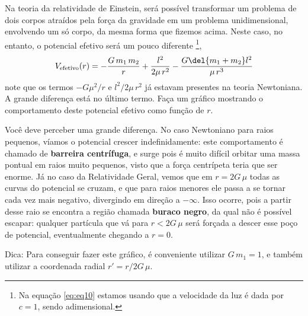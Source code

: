 \documentclass[]{IMTexam}
\begin{document}
\begin{questions}
\begin{parts}
	\end{parts}


	Na teoria da relatividade de Einstein, será possível transformar um problema de dois corpos atraídos pela força da gravidade em um problema unidimensional, envolvendo um só corpo, da mesma forma que fizemos acima. Neste caso, no entanto, o potencial efetivo será um pouco diferente%
	\footnote{Na equação \ref{eq:eq10} estamos usando que a velocidade da luz é dada por $ c = 1 $, sendo adimensional.},
	\begin{equation}\label{eq:eq10}
		V_{\textup{efetivo}}(r)=-\dfrac{G\,m_1\,m_2}{r}+\dfrac{l^{2}}{2\mu\,r^{2}}-\dfrac{G\del{m_1+m_2}l^{2}}{\mu\,r^{3}}
	\end{equation}
	note que os termos $ -G\mu^{2}/r $ e $ l^{2}/2\mu\,r^{2} $ já estavam presentes na teoria Newtoniana. A grande diferença está no último termo. Faça um gráfico mostrando o comportamento deste potencial efetivo como função de $ r $.

	Você deve perceber uma grande diferença. No caso Newtoniano para raios pequenos, víamos o potencial crescer indefinidamente: este comportamento é chamado de \textbf{barreira centrífuga}, e surge pois é muito difícil orbitar uma massa pontual em raios muito pequenos, visto que a força centrípeta teria que ser enorme. Já no caso da Relatividade Geral, vemos que em $ r = 2G\,\mu $  todas as curvas do potencial se cruzam, e que para raios menores ele passa a se tornar cada vez mais negativo, divergindo em direção a $ -\infty $. Isso ocorre, pois a partir desse raio se encontra a região chamada \textbf{buraco negro}, da qual não é possível escapar: qualquer partícula que vá para $ r<2G\,\mu $ será forçada a descer esse poço de potencial, eventualmente chegando a $ r = 0 $.

	Dica: Para conseguir fazer este gráfico, é conveniente utilizar $ G\,m_1=1 $, e também utilizar a coordenada radial $ r'=r/2G\,\mu $.


\end{questions}
\end{document}
